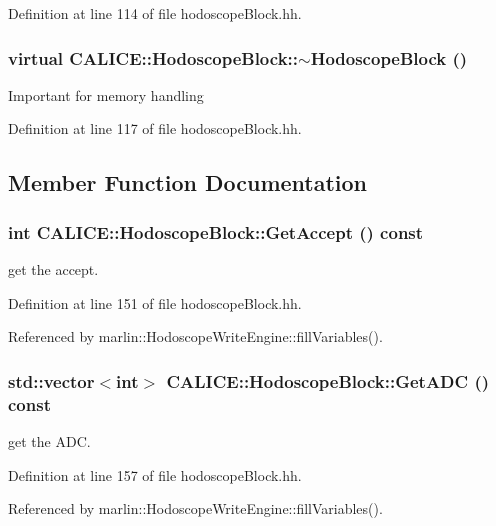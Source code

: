 Definition at line 114 of file hodoscopeBlock.hh.
\subsubsection[{$\sim$HodoscopeBlock}]{\setlength{\rightskip}{0pt plus 5cm}virtual CALICE::HodoscopeBlock::$\sim$HodoscopeBlock ()\hspace{0.3cm}{\ttfamily  [inline, virtual]}}\label{classCALICE_1_1HodoscopeBlock_a77c74643079308a155cd817f0b880240}
Important for memory handling 

Definition at line 117 of file hodoscopeBlock.hh.

\subsection{Member Function Documentation}
\subsubsection[{GetAccept}]{\setlength{\rightskip}{0pt plus 5cm}int CALICE::HodoscopeBlock::GetAccept () const\hspace{0.3cm}{\ttfamily  [inline]}}\label{classCALICE_1_1HodoscopeBlock_ab95e3074f19f0cbc1cfc27276933f023}
get the accept. 

Definition at line 151 of file hodoscopeBlock.hh.

Referenced by marlin::HodoscopeWriteEngine::fillVariables().
\subsubsection[{GetADC}]{\setlength{\rightskip}{0pt plus 5cm}std::vector$<$int$>$ CALICE::HodoscopeBlock::GetADC () const\hspace{0.3cm}{\ttfamily  [inline]}}\label{classCALICE_1_1HodoscopeBlock_a93aa4e2366ab5e2563eede8426586d19}
get the ADC. 

Definition at line 157 of file hodoscopeBlock.hh.

Referenced by marlin::HodoscopeWriteEngine::fillVariables().
